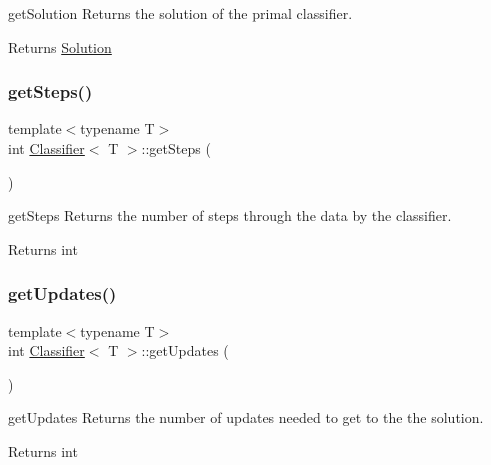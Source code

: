 get\+Solution Returns the solution of the primal classifier. 

\begin{DoxyReturn}{Returns}
\hyperlink{class_solution}{Solution} 
\end{DoxyReturn}
\mbox{\label{class_classifier_a6e6d5041d6945bc62581323d2d3b5ab1}} 
\subsubsection{\texorpdfstring{get\+Steps()}{getSteps()}}
{\footnotesize\ttfamily template$<$typename T$>$ \\
int \hyperlink{class_classifier}{Classifier}$<$ T $>$\+::get\+Steps (\begin{DoxyParamCaption}{ }\end{DoxyParamCaption})\hspace{0.3cm}{\ttfamily [inline]}}



get\+Steps Returns the number of steps through the data by the classifier. 

\begin{DoxyReturn}{Returns}
int 
\end{DoxyReturn}
\mbox{\label{class_classifier_abde870e234b342455e113e05900f7339}} 
\subsubsection{\texorpdfstring{get\+Updates()}{getUpdates()}}
{\footnotesize\ttfamily template$<$typename T$>$ \\
int \hyperlink{class_classifier}{Classifier}$<$ T $>$\+::get\+Updates (\begin{DoxyParamCaption}{ }\end{DoxyParamCaption})\hspace{0.3cm}{\ttfamily [inline]}}



get\+Updates Returns the number of updates needed to get to the the solution. 

\begin{DoxyReturn}{Returns}
int 
\end{DoxyReturn}
\mbox{\label{class_classifier_a318ff28416f40269c532a80827fb30fb}} 
